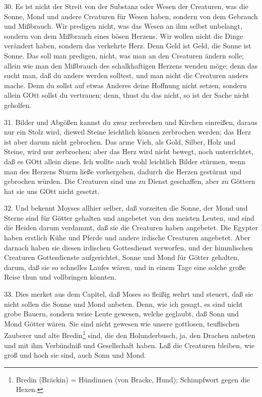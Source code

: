 30. Es ist nicht der Streit von der Substanz oder Wesen der Creaturen, was die Sonne, Mond und andere Creaturen für Wesen haben, sondern von dem Gebrauch und Mißbrauch. Wir predigen nicht, was das Wesen an ihm
selbst unbelangt, sondern von dem Mißbrauch eines bösen Herzens. Wir wollen nicht die Dinge verändert haben, sondern das verkehrte Herz. Denn Geld ist Geld, die Sonne ist Sonne. Das soll man predigen, nicht, was man an den Creaturen ändern solle; allein wie man den Mißbrauch des schalkhaftigen Herzens wenden möge; denn das sucht man, daß du anders werden solltest, und man nicht die Creaturen anders mache. Denn du sollst auf etwas Anderes deine Hoffnung nicht setzen, sondern allein GOtt sollst du vertrauen; denn, thust du das nicht, so ist der Sache nicht geholfen.

31. Bilder und Abgößen kannst du zwar zerbrechen und Kirchen einreißen, daraus nur ein Stolz wird, dieweil Steine leichtlich können zerbrochen werden; das Herz ist aber darum nicht gebrochen. Das arme Vieh, als Gold, Silber, Holz und Steine, wird nur zerbrochen; aber das Herz wird nicht bewegt, noch unterrichtet, daß es GOtt allein diene. Ich wollte auch wohl leichtlich Bilder stürmen, wenn man des Herzens Sturm ließe vorhergehen, dadurch die Herzen gestürmt und gebrochen würden. Die Creaturen sind uns zu Dienst geschaffen, aber zu Göttern hat sie uns GOtt nicht gesetzt.

32. Und bekennt Moyses allhier selber, daß vorzeiten die Sonne, der Mond und Sterne sind für Götter gehalten und angebetet von den meisten Leuten, und sind die Heiden darum verdammt, daß sie die Creaturen haben angebetet. Die Egypter haben erstlich Kühe und Pferde und andere irdische Creaturen angebetet. Aber darnach haben sie diesen irdischen Gottesdienst verworfen, und der himmlischen Creaturen Gottesdienste aufgerichtet, Sonne und Mond für Götter gehalten, darum, daß sie so schnelles Laufes wären, und in einem Tage eine solche große Reise thun und vollbringen könnten.

33. Dies merket aus dem Capitel, daß Moses so fleißig wehrt und steuert, daß sie nicht sollen die Sonne und Mond anbeten. Denn, wie ich gesagt, es sind nicht grobe Bauern, sondern weise Leute gewesen, welche geglaubt, daß Sonn und Mond Götter wären. Sie sind nicht gewesen wie unsere gottlosen, teuflischen Zauberer und alte Bredin\footnote{Bredin (Bräckin) = Hündinnen (von Bracke, Hund); Schimpfwort gegen die Hexen.} sind, die den Holunderbusch, ja, den Drachen anbeten und mit ihm Verbündniß und Gesellschaft haben. Laß die Creaturen bleiben, wie groß und hoch sie sind, auch Sonn und Mond.


